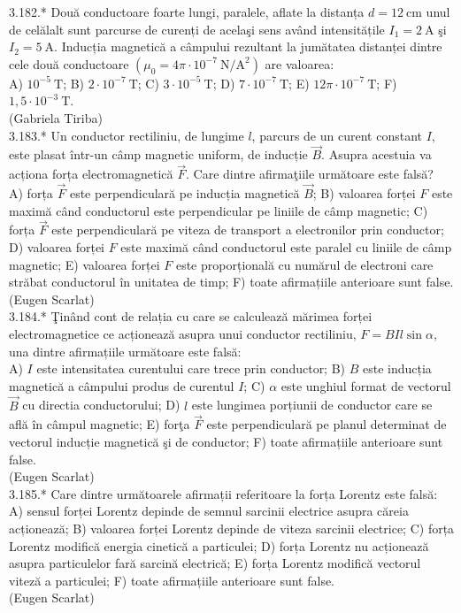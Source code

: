 \documentclass[10pt]{article}
\begin{document}
3.182.* Două conductoare foarte lungi, paralele, aflate la distanța $d=12 \mathrm{~cm}$ unul de celălalt sunt parcurse de curenți de acelaşi sens având intensitățile $I_{1}=2 \mathrm{~A}$ şi $I_{2}=5 \mathrm{~A}$. Inducția magnetică a câmpului rezultant la jumătatea distanței dintre cele două conductoare $\left(\mu_{0}=4 \pi \cdot 10^{-7} \mathrm{~N} / \mathrm{A}^{2}\right)$ are valoarea:\\ A) $10^{-5} \mathrm{~T}$; B) $2 \cdot 10^{-7} \mathrm{~T}$; C) $3 \cdot 10^{-5} \mathrm{~T}$; D) $7 \cdot 10^{-7} \mathrm{~T}$; E) $12 \pi \cdot 10^{-7} \mathrm{~T}$; F) $1,5 \cdot 10^{-3} \mathrm{~T}$.\\ (Gabriela Tiriba)\\

3.183.* Un conductor rectiliniu, de lungime $l$, parcurs de un curent constant $I$, este plasat într-un câmp magnetic uniform, de inducție $\vec{B}$. Asupra acestuia va acționa forța electromagnetică $\vec{F}$. Care dintre afirmaţiile următoare este falsă?\\ A) forța $\vec{F}$ este perpendiculară pe inducția magnetică $\vec{B}$; B) valoarea forței $F$ este maximă când conductorul este perpendicular pe liniile de câmp magnetic; C) forța $\vec{F}$ este perpendiculară pe viteza de transport a electronilor prin conductor; D) valoarea forței $F$ este maximă când conductorul este paralel cu liniile de câmp magnetic; E) valoarea forței $F$ este proporțională cu numărul de electroni care străbat conductorul în unitatea de timp; F) toate afirmațiile anterioare sunt false.\\ (Eugen Scarlat)\\

3.184.* Ţinând cont de relația cu care se calculează mărimea forței electromagnetice ce acționează asupra unui conductor rectiliniu, $F=B I l \sin \alpha$, una dintre afirmațiile următoare este falsă:\\ A) $I$ este intensitatea curentului care trece prin conductor; B) $B$ este inducția magnetică a câmpului produs de curentul $I$; C) $\alpha$ este unghiul format de vectorul $\vec{B}$ cu directia conductorului; D) $l$ este lungimea porțiunii de conductor care se află în câmpul magnetic; E) forţa $\vec{F}$ este perpendiculară pe planul determinat de vectorul inducție magnetică şi de conductor; F) toate afirmațiile anterioare sunt false.\\ (Eugen Scarlat)\\

3.185.* Care dintre următoarele afirmații referitoare la forța Lorentz este falsă:\\ A) sensul forței Lorentz depinde de semnul sarcinii electrice asupra căreia acționează; B) valoarea forței Lorentz depinde de viteza sarcinii electrice; C) forța Lorentz modifică energia cinetică a particulei; D) forța Lorentz nu acționează asupra particulelor fară sarcină electrică; E) forța Lorentz modifică vectorul viteză a particulei; F) toate afirmațiile anterioare sunt false.\\ (Eugen Scarlat)\\
\end{document}
